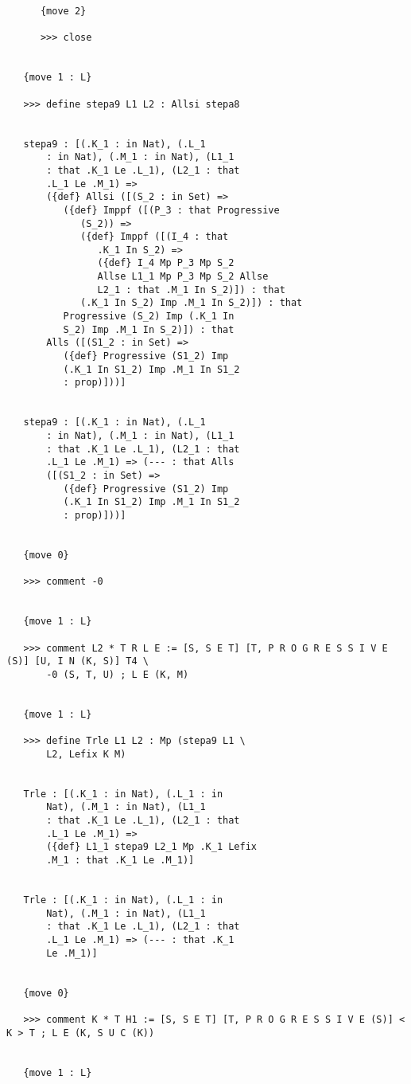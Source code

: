 \documentclass{article}
\begin{document}
\begin{verbatim}
      {move 2}

      >>> close


   {move 1 : L}

   >>> define stepa9 L1 L2 : Allsi stepa8


   stepa9 : [(.K_1 : in Nat), (.L_1 
       : in Nat), (.M_1 : in Nat), (L1_1 
       : that .K_1 Le .L_1), (L2_1 : that 
       .L_1 Le .M_1) => 
       ({def} Allsi ([(S_2 : in Set) => 
          ({def} Imppf ([(P_3 : that Progressive 
             (S_2)) => 
             ({def} Imppf ([(I_4 : that 
                .K_1 In S_2) => 
                ({def} I_4 Mp P_3 Mp S_2 
                Allse L1_1 Mp P_3 Mp S_2 Allse 
                L2_1 : that .M_1 In S_2)]) : that 
             (.K_1 In S_2) Imp .M_1 In S_2)]) : that 
          Progressive (S_2) Imp (.K_1 In 
          S_2) Imp .M_1 In S_2)]) : that 
       Alls ([(S1_2 : in Set) => 
          ({def} Progressive (S1_2) Imp 
          (.K_1 In S1_2) Imp .M_1 In S1_2 
          : prop)]))]


   stepa9 : [(.K_1 : in Nat), (.L_1 
       : in Nat), (.M_1 : in Nat), (L1_1 
       : that .K_1 Le .L_1), (L2_1 : that 
       .L_1 Le .M_1) => (--- : that Alls 
       ([(S1_2 : in Set) => 
          ({def} Progressive (S1_2) Imp 
          (.K_1 In S1_2) Imp .M_1 In S1_2 
          : prop)]))]


   {move 0}

   >>> comment -0


   {move 1 : L}

   >>> comment L2 * T R L E := [S, S E T] [T, P R O G R E S S I V E (S)] [U, I N (K, S)] T4 \
       -0 (S, T, U) ; L E (K, M)


   {move 1 : L}

   >>> define Trle L1 L2 : Mp (stepa9 L1 \
       L2, Lefix K M)


   Trle : [(.K_1 : in Nat), (.L_1 : in 
       Nat), (.M_1 : in Nat), (L1_1 
       : that .K_1 Le .L_1), (L2_1 : that 
       .L_1 Le .M_1) => 
       ({def} L1_1 stepa9 L2_1 Mp .K_1 Lefix 
       .M_1 : that .K_1 Le .M_1)]


   Trle : [(.K_1 : in Nat), (.L_1 : in 
       Nat), (.M_1 : in Nat), (L1_1 
       : that .K_1 Le .L_1), (L2_1 : that 
       .L_1 Le .M_1) => (--- : that .K_1 
       Le .M_1)]


   {move 0}

   >>> comment K * T H1 := [S, S E T] [T, P R O G R E S S I V E (S)] < K > T ; L E (K, S U C (K))


   {move 1 : L}


\end{verbatim}
\end{document}
